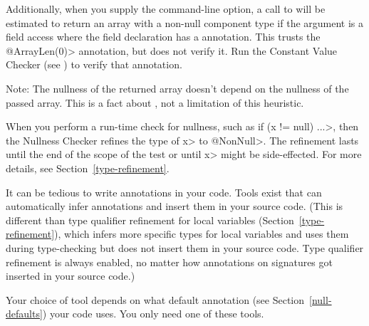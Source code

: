 Additionally, when you supply the  command-line
option, a call to  will be estimated to return an array
with a non-null component type if the argument is a field access where the field
declaration has a 
annotation.
This trusts the \<@ArrayLen(0)> annotation, but does not verify it. Run the
Constant Value Checker (see ) to verify
that annotation.

Note: The nullness of the returned array doesn't depend on the nullness of the passed array.
This is a fact about
,
not a limitation of this heuristic.



When you perform a run-time check for nullness, such as \<if (x != null)
...>, then the Nullness Checker refines the type of \<x> to
\<@NonNull>.  The refinement lasts until the end of the scope of the test
or until \<x> might be side-effected.  For more details, see
Section~\ref{type-refinement}.



It can be tedious to write annotations in your code.  Tools exist that
can automatically infer annotations and insert them in your source code.
(This is different than type qualifier refinement for local variables
(Section~\ref{type-refinement}), which infers more specific types for
local variables and uses them during type-checking but does not insert them
in your source code.  Type qualifier refinement is always enabled, no
matter how annotations on signatures got inserted in your source code.)

Your choice of tool depends on what default annotation (see
Section~\ref{null-defaults}) your code uses.  You only need one of these tools.

